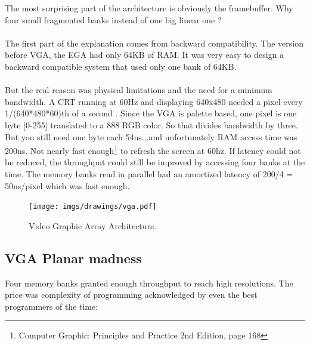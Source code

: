 \documentclass[book.tex]{subfiles}
\begin{document}
The most surprising part of the architecture is obviously the framebuffer. Why four small fragmented banks instead of one big linear one ?\\
\\
The first part of the explanation comes from backward compatibility. The version before VGA, the EGA had only 64KB of RAM. It was very easy to design a backward compatible system that used only one bank of 64KB.\\
\\
But the real reason was physical limitations and the need for a minimum bandwidth. A CRT running at 60Hz and displaying 640x480 needed a pixel every 1/(640*480*60)th of a second . Since the VGA is palette based, one pixel is one byte [0-255] translated to a 888 RGB color. So that divides bandwidth by three. But you still need one byte each 54ns...and unfortunately RAM access time was 200ns. Not nearly fast enough\footnote{Computer Graphic: Principles and Practice 2nd Edition, page 168} to refresh the screen at 60hz. If latency could not be reduced, the throughput could still be improved by accessing four banks at the time. The memory banks read in parallel had an amortized latency of 200/4 = 50ns/pixel which was fast enough.


\begin{figure}[H]
\centering
\texttt{[image: imgs/drawings/vga.pdf]}
\caption{Video Graphic Array Architecture.}
\label{fig:vga_arch}
\end{figure}




\subsection{VGA Planar madness}

Four memory banks granted enough throughput to reach high resolutions. The price was complexity of programming acknowledged by even the best programmers of the time:\\
\end{document}
